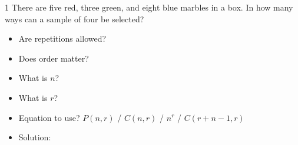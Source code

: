 \documentclass[a4paper,12pt]{book}
\newcounter{question}
\begin{document}
        \hrulefill
        
        \begin{question}{\thequestion}{1}
            There are five red, three green, and eight blue marbles in a box.
            In how many ways can a sample of four be selected?
            
            \begin{itemize}
                \item[]     Are repetitions allowed?    
                \item[]     Does order matter?          
                \item[]     What is $n$?                
                \item[]     What is $r$?                
                \item[]     Equation to use? $P(n,r)$ / $C(n,r)$ / $n^{r}$ / $C(r+n-1,r)$            
                \item[]     Solution: 
            \end{itemize}
        \end{question}
        
        \hrulefill
        
\end{document}
